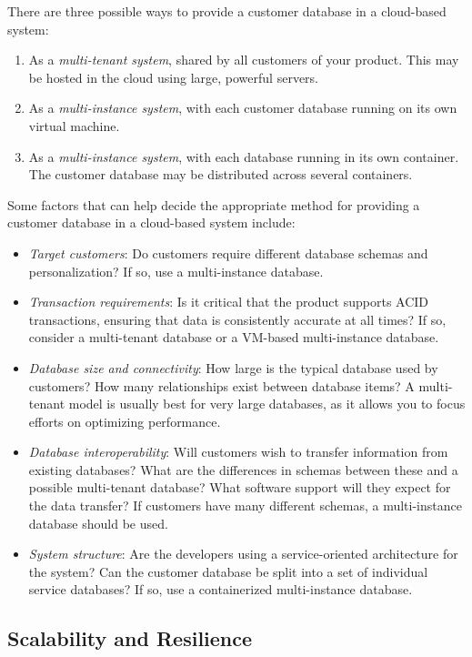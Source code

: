There are three possible ways to provide a customer database in a cloud-based system:
\begin{enumerate}
    \item As a \textit{multi-tenant system}, shared by all customers of your product. This may be hosted in the cloud using large, powerful servers.
    \item As a \textit{multi-instance system}, with each customer database running on its own virtual machine.
    \item As a \textit{multi-instance system}, with each database running in its own container. The customer database may be distributed across several containers.
\end{enumerate}
\newpage
\noindent
Some factors that can help decide the appropriate method for providing a customer database in a cloud-based system include:
\begin{itemize}
    \item \emph{Target customers}: Do customers require different database schemas and personalization? If so, use a multi-instance database.
    \item \emph{Transaction requirements}: Is it critical that the product supports ACID transactions, ensuring that data is consistently accurate at all times? If so, consider a multi-tenant database or a VM-based multi-instance database.
    \item \emph{Database size and connectivity}: How large is the typical database used by customers? How many relationships exist between database items? A multi-tenant model is usually best for very large databases, as it allows you to focus efforts on optimizing performance.
    \item \emph{Database interoperability}: Will customers wish to transfer information from existing databases? What are the differences in schemas between these and a possible multi-tenant database? What software support will they expect for the data transfer? If customers have many different schemas, a multi-instance database should be used.
    \item \emph{System structure}: Are the developers using a service-oriented architecture for the system? Can the customer database be split into a set of individual service databases? If so, use a containerized multi-instance database.
\end{itemize}

\subsection{Scalability and Resilience}

